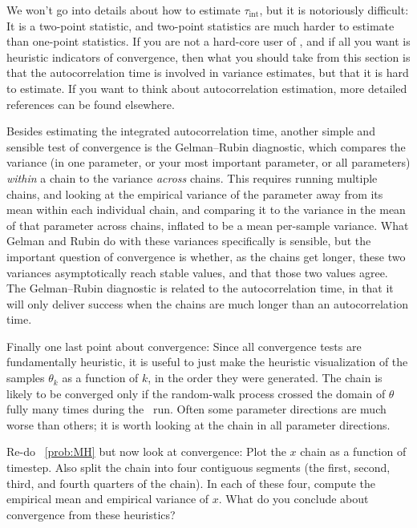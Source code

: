 \documentclass[modern]{aastex61}
\newcommand{\MCMC}{\acronym{MCMC}}
\newcommand{\pars}{\theta}
\begin{document}
We won't go into details about how to estimate $\tau_\mathrm{int}$, but it is
notoriously difficult: It is a two-point statistic, and two-point statistics
are much harder to estimate than one-point statistics.
If you are not a hard-core user of \MCMC, and if all you want is
heuristic indicators of convergence, then what you should take from this
section is that the autocorrelation time is involved in variance estimates,
but that it is hard to estimate.
If you want to think about autocorrelation estimation, more detailed
references can be found elsewhere.

Besides estimating the integrated autocorrelation time, another simple and
sensible test of convergence is the Gelman--Rubin
diagnostic, which compares the variance (in one
parameter, or your most important parameter, or all parameters) \emph{within}
a chain to the variance \emph{across} chains.
This requires running multiple chains, and looking at the empirical
variance of the parameter away from its mean within each individual
chain, and comparing it to the variance in the mean of that parameter
across chains, inflated to be a mean per-sample variance.
What Gelman and Rubin do with these variances specifically is
sensible, but the important question of convergence is whether, as the
chains get longer, these two variances asymptotically reach stable
values, and that those two values agree.
The Gelman--Rubin diagnostic is related to the autocorrelation time,
in that it will only deliver success when the chains are much longer
than an autocorrelation time.

Finally one last point about convergence:
Since all convergence tests are fundamentally heuristic, it is useful
to just make the heuristic visualization of the samples $\pars_k$ as a
function of $k$, in the order they were generated.
The chain is likely to be converged only if the random-walk process
crossed the domain of $\pars$ fully many times during the \MCMC\ run.
Often some parameter directions are much worse than others; it is
worth looking at the chain in all parameter directions.

\begin{problem}\label{prob:convergence}
Re-do \problemname~\ref{prob:MH} but now look at convergence:
Plot the $x$ chain as a function of timestep.  Also split the chain
into four contiguous segments (the first, second, third, and fourth
quarters of the chain).  In each of these four, compute the empirical
mean and empirical variance of $x$.  What do you conclude about
convergence from these heuristics?
\end{problem}
\end{document}
